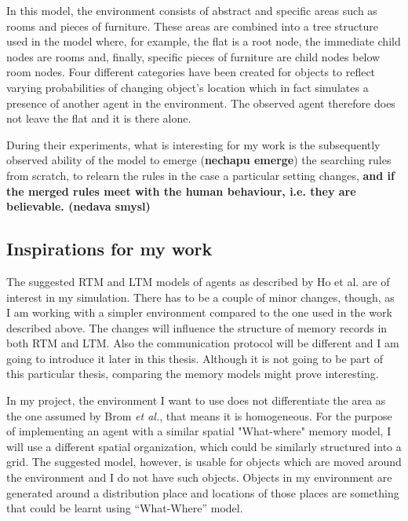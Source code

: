 In this model, the environment consists of abstract and specific areas such as rooms and pieces of furniture. These areas are combined into a tree structure used in the model where, for example, the flat is a root node, the immediate child nodes are rooms and, finally, specific pieces of furniture are child nodes below room nodes. Four different categories have been created for objects to reflect varying probabilities of changing object’s location which in fact simulates a presence of another agent in the environment. The observed agent therefore does not leave the flat and it is there alone.

During their experiments, what is interesting for my work is the subsequently observed ability of the model to emerge (\textbf{nechapu emerge}) the searching rules from scratch, to relearn the rules in the case a particular setting changes, \textbf{and if the merged rules meet with the human behaviour, i.e. they are believable. (nedava smysl)}
                 
\subsection{Inspirations for my work}

The suggested RTM and LTM models of agents as described by Ho et al. are of interest in my simulation. \cite{Ho:memoryarchitectures} There has to be a couple of minor changes, though, as I am working with a simpler environment compared to the one used in the work described above. The changes will influence the structure of memory records in both RTM and LTM. Also the communication protocol will be different and I am going to introduce it later in this thesis. Although it is not going to be part of this particular thesis, comparing the memory models might prove interesting.

In my project, the environment I want to use does not differentiate the area as the one assumed by Brom \textit{et al.}, that means it is homogeneous. \cite{Brom:placeandobjects} For the purpose of implementing an agent with a similar spatial "What-where" memory model, I will use a different spatial organization, which could be similarly structured into a grid. The suggested model, however, is usable for objects which are moved around the environment and I do not have such objects. Objects in my environment are generated around a distribution place and locations of those places are something that could be learnt using “What-Where” model. 